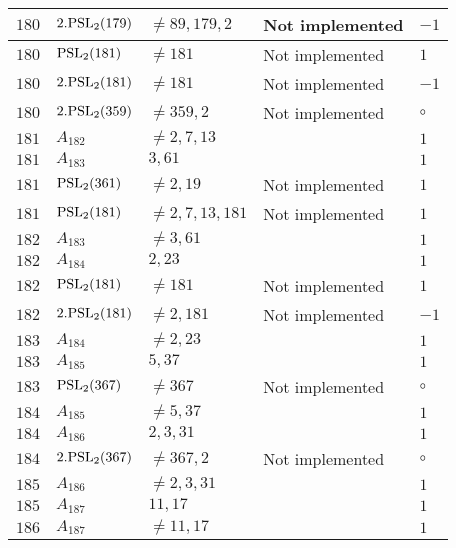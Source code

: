 \documentclass[a4paper, 11pt]{article}
\begin{document}
\begin{longtable}{lllll}
        $ 180 $ & $ 2.{\rm PSL}_{2}(179) $ & $ \neq 89, 179, 2 $ & Not implemented & $ -1  $ \\ \hline
        $ 180 $ & $ {\rm PSL}_{2}(181) $ & $ \neq 181 $ & Not implemented & $ 1  $ \\ \hline
        $ 180 $ & $ 2.{\rm PSL}_{2}(181) $ & $ \neq 181 $ & Not implemented & $ -1  $ \\ \hline
        $ 180 $ & $ 2.{\rm PSL}_{2}(359) $ & $ \neq 359, 2 $ & Not implemented & $\circ$ \\ \hline
        $ 181 $ & $ A_{182} $ & $ \neq 2, 7, 13 $ & $ ~ $ & $ 1  $ \\ \hline
        $ 181 $ & $ A_{183} $ & $ 3, 61 $ & $ ~ $ & $ 1  $ \\ \hline
        $ 181 $ & $ {\rm PSL}_{2}(361) $ & $ \neq 2, 19 $ & Not implemented & $ 1  $ \\ \hline
        $ 181 $ & $ {\rm PSL}_{2}(181) $ & $ \neq 2, 7, 13, 181 $ & Not implemented & $ 1  $ \\ \hline
        $ 182 $ & $ A_{183} $ & $ \neq 3, 61 $ & $ ~ $ & $ 1  $ \\ \hline
        $ 182 $ & $ A_{184} $ & $ 2, 23 $ & $ ~ $ & $ 1  $ \\ \hline
        $ 182 $ & $ {\rm PSL}_{2}(181) $ & $ \neq 181 $ & Not implemented & $ 1  $ \\ \hline
        $ 182 $ & $ 2.{\rm PSL}_{2}(181) $ & $ \neq 2, 181 $ & Not implemented & $ -1  $ \\ \hline
        $ 183 $ & $ A_{184} $ & $ \neq 2, 23 $ & $ ~ $ & $ 1  $ \\ \hline
        $ 183 $ & $ A_{185} $ & $ 5, 37 $ & $ ~ $ & $ 1  $ \\ \hline
        $ 183 $ & $ {\rm PSL}_{2}(367) $ & $ \neq 367 $ & Not implemented & $\circ$ \\ \hline
        $ 184 $ & $ A_{185} $ & $ \neq 5, 37 $ & $ ~ $ & $ 1  $ \\ \hline
        $ 184 $ & $ A_{186} $ & $ 2, 3, 31 $ & $ ~ $ & $ 1  $ \\ \hline
        $ 184 $ & $ 2.{\rm PSL}_{2}(367) $ & $ \neq 367, 2 $ & Not implemented & $\circ$ \\ \hline
        $ 185 $ & $ A_{186} $ & $ \neq 2, 3, 31 $ & $ ~ $ & $ 1  $ \\ \hline
        $ 185 $ & $ A_{187} $ & $ 11, 17 $ & $ ~ $ & $ 1  $ \\ \hline
        $ 186 $ & $ A_{187} $ & $ \neq 11, 17 $ & $ ~ $ & $ 1  $ \\ \hline

\end{longtable}
\end{document}
